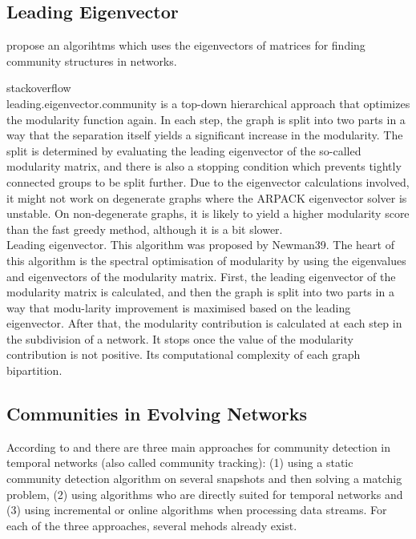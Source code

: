 \subsection{Leading Eigenvector}
\textcite{newman2006finding} propose an algorihtms which uses the eigenvectors of matrices for finding community structures in networks.

stackoverflow\\
leading.eigenvector.community is a top-down hierarchical approach that optimizes the modularity function again. In each step, the graph is split into two parts in a way that the separation itself yields a significant increase in the modularity. The split is determined by evaluating the leading eigenvector of the so-called modularity matrix, and there is also a stopping condition which prevents tightly connected groups to be split further. Due to the eigenvector calculations involved, it might not work on degenerate graphs where the ARPACK eigenvector solver is unstable. On non-degenerate graphs, it is likely to yield a higher modularity score than the fast greedy method, although it is a bit slower.\\

Leading eigenvector.  This algorithm was proposed by Newman39. The heart of this algorithm is the spectral optimisation of modularity by using the eigenvalues and eigenvectors of the modularity matrix. First, the leading eigenvector of the modularity matrix is calculated, and then the graph is split into two parts in a way that modu-larity improvement is maximised based on the leading eigenvector. After that, the modularity contribution is calculated at each step in the subdivision of a network. It stops once the value of the modularity contribution is not positive. Its computational complexity of each graph bipartition.~\cite{yang2016comparative}


\subsection{Communities in Evolving Networks}
\label{sec:bg:tracking}
According to \textcite{aynaud2013communities} and \textcite{brodka2014community} there are three main approaches for community detection in temporal networks (also called community tracking): (1) using a static community detection algorithm on several snapshots and then solving a matchig problem, (2) using algorithms who are directly suited for temporal networks and (3) using incremental or online algorithms when processing data streams. For each of the three approaches, several mehods already exist.

